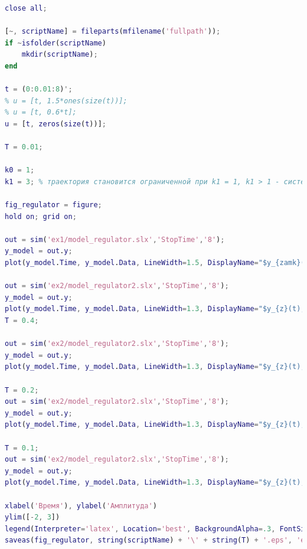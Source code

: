 \documentclass[a4paper]{article}
\begin{document}
\begin{lstlisting}[caption={Код для построения графиков для задания 2}, language=matlab]
% clear all;
close all;

[~, scriptName] = fileparts(mfilename('fullpath'));
if ~isfolder(scriptName)
    mkdir(scriptName);
end

t = (0:0.01:8)';
% u = [t, 1.5*ones(size(t))];
% u = [t, 0.6*t];
u = [t, zeros(size(t))];

T = 0.01;

k0 = 1;
k1 = 3; % траектория становится ограниченной при k1 = 1, k1 > 1 - система Ау, k1 < 1 - Ну

fig_regulator = figure;
hold on; grid on;

out = sim('ex1/model_regulator.slx','StopTime','8');
y_model = out.y;
plot(y_model.Time, y_model.Data, LineWidth=1.5, DisplayName="$y_{zamk}(t)$", Color='black')

out = sim('ex2/model_regulator2.slx','StopTime','8');
y_model = out.y;
plot(y_model.Time, y_model.Data, LineWidth=1.3, DisplayName="$y_{z}(t), T = " + string(T) + "$")
T = 0.4;

out = sim('ex2/model_regulator2.slx','StopTime','8');
y_model = out.y;
plot(y_model.Time, y_model.Data, LineWidth=1.3, DisplayName="$y_{z}(t), T = " + string(T) + "$")

T = 0.2;
out = sim('ex2/model_regulator2.slx','StopTime','8');
y_model = out.y;
plot(y_model.Time, y_model.Data, LineWidth=1.3, DisplayName="$y_{z}(t), T = " + string(T) + "$")

T = 0.1;
out = sim('ex2/model_regulator2.slx','StopTime','8');
y_model = out.y;
plot(y_model.Time, y_model.Data, LineWidth=1.3, DisplayName="$y_{z}(t), T = " + string(T) + "$")

xlabel('Время'), ylabel('Амплитуда')
ylim([-2, 3])
legend(Interpreter='latex', Location='best', BackgroundAlpha=.3, FontSize=12, FontName='Computer Modern')
saveas(fig_regulator, string(scriptName) + '\' + string(T) + '.eps', 'epsc')
\end{lstlisting}
\end{document}
